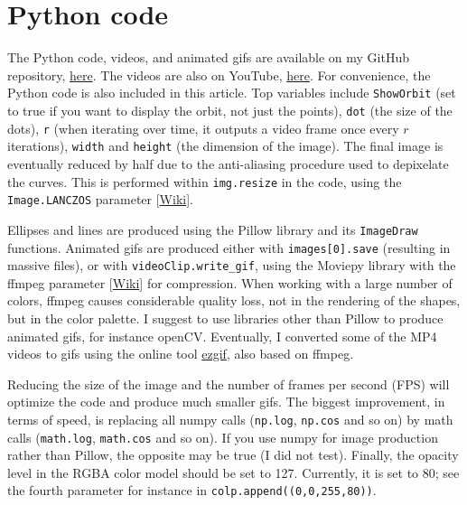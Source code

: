 \documentclass[oneside,10pt]{book}
\renewcommand{\arraystretch}{1.4} %
\begin{document}
\renewcommand{\arraystretch}{1.0} %
\renewcommand{\arraystretch}{1.4} %

\section{Python code}\label{pythonviz}

The Python code, videos, and animated gifs are available on my GitHub repository, \href{https://github.com/VincentGranville/Visualizations}{here}.
The videos are also on YouTube, \href{https://www.youtube.com/c/VincentGranvilleVideos}{here}. For convenience, the Python code is also included 
in this article. Top variables include \texttt{ShowOrbit} (set to true if you want to display the orbit, not just the points), \texttt{dot} (the size of the dots), \texttt{r} (when iterating over time, it outputs a video frame once every $r$ iterations), \texttt{width} and \texttt{height} (the dimension of the image). The final image is eventually reduced by half due to the \textcolor{index}{anti-aliasing} procedure used to depixelate the curves. This is performed
within \texttt{img.resize} in the code, using the \texttt{Image.LANCZOS} parameter [\href{https://en.wikipedia.org/wiki/Lanczos_resampling}{Wiki}]. 

Ellipses and lines are produced using the Pillow library and its \texttt{ImageDraw} functions. Animated gifs are produced either 
with 
\texttt{images[0].save} 
(resulting in massive files), or with \texttt{videoClip.write\_gif}, using the Moviepy library with the \textcolor{index}{ffmpeg} parameter [\href{https://en.wikipedia.org/wiki/FFmpeg}{Wiki}] for compression. When working with a large number of colors, ffmpeg causes considerable quality loss, not in the rendering of the shapes, but in the color palette.  I suggest to use libraries other than Pillow to produce animated gifs, for instance openCV. Eventually, I converted some of the MP4 videos to gifs using the online tool \href{https://ezgif.com/video-to-gif}{ezgif}, also based on ffmpeg. 

Reducing the size of the image and the number of frames per second (FPS)  will optimize the code and produce much smaller gifs. The biggest improvement, in terms of speed, is replacing all numpy calls (\texttt{np.log}, \texttt{np.cos} and so on) by math calls 
(\texttt{math.log}, \texttt{math.cos} and so on). If you use numpy for image production rather than Pillow, the opposite may be true (I did not test). Finally, the opacity level in the RGBA color model should be set to 127. Currently, it is set to 80; see the fourth parameter for instance in 
\texttt{colp.append((0,0,255,80))}.
\end{document}
